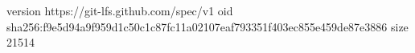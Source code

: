 version https://git-lfs.github.com/spec/v1
oid sha256:f9e5d94a9f959d1c50c1c87fc11a02107eaf793351f403ec855e459de87e3886
size 21514
